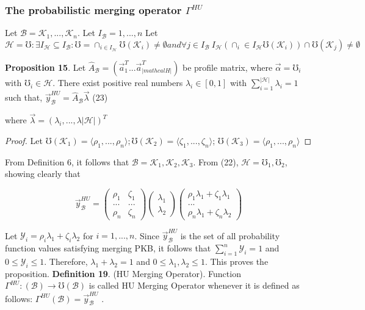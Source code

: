 \documentclass[]{iosart2c}
\begin{document}
\subsubsection{The probabilistic merging operator $\Gamma^{HU}$}

Let  $\mathcal{B} = {\mathcal{K}_1, ...,\mathcal{K}_n}$. Let $I_\mathcal{B} = {1, ..., n} $
Let $\mathcal{H} = { \mho : \exists I_\mathcal{H} \subseteq I_\mathcal{B} : \mho = \cap_{i \in I_\mathcal{H}} \mho(\mathcal{K}_i) \neq \emptyset and \forall j \in I_\mathcal{B} \ I_\mathcal{H}(\cap_i\in I_\mathcal{H} \mho(\mathcal{K}_i)) \cap \mho(\mathcal{K}_j) \neq \emptyset }$

\textbf{Proposition 15}. Let $\hat{A}_\mathcal{B} = (\vec{a}^T_1 ...\vec{a}^T_|mathcal{H}|)$ be profile
matrix, where $\vec{\alpha} = \mho_i$ with $\mho_i \in \mathcal{H}$. There exist positive
real numbers $\lambda_i \in [0, 1]$ with $\sum^{|\mathcal{H}|}_{i=1} \lambda_i = 1$ such
that,
$\vec{y}^{HU}_\mathcal{B} = \hat{A}_\mathcal{B}\vec{\lambda}$ (23)

where $\vec{\lambda} = (\lambda_i, ..., \lambda|\mathcal{H}|)^T$

\begin{proof}Let $\mho(\mathcal{K}_1)=\langle \rho_1, ..., \rho_n \rangle;\mho(\mathcal{K}_2)=\langle\zeta_1, ..., \zeta_n \rangle$;
$\mho(\mathcal{K}_3) = \langle\rho_1, ..., \rho_n\rangle$
 \end{proof}
From Definition 6, it follows that $\mathcal{B} = {\mathcal{K}_1,
\mathcal{K}_2,\mathcal{K}_3}$. From (22), $\mathcal{H} = {\mho_1,\mho_2}$, showing clearly
that

$$
\vec{y}^{HU}_\mathcal{B} =
\left( \begin{array}{cc}
\rho_1 &\zeta_1 \\
... &... \\
\rho_n &\zeta_n
\end{array} \right)
%
\left( \begin{array}{cc}
\lambda_1\\
\lambda_2
\end{array}
\right)
\left( \begin{array}{cc}
\rho_1\lambda_1 + \zeta_1\lambda_1\\
...\\
\rho_n\lambda_1 + \zeta_n\lambda_2
\end{array} \right)
$$

Let $\mathcal{Y}_i = \rho_i\lambda_1 + \zeta_i\lambda_2$ for $i = 1, ... , n$. Since $\vec{y}^{HU}_\mathcal{B}$
 is the set of all probability function values satisfying
merging PKB, it follows that $\sum^n_{i=1} \mathcal{Y}_i = 1$ and $0 \le 
\mathcal{Y}_i \le 1$. Therefore, $\lambda_1 + \lambda_2 = 1$ and $0 \le \lambda_1, \lambda_2 \le 1$.
 This proves the proposition.
\textbf{Definition 19}. (HU Merging Operator). Function
$\Gamma^{HU} : (\mathcal{B}) \to \mho(\mathcal{B})$ is called HU Merging Operator
whenever it is defined as follows: $\Gamma^{HU}(\mathcal{B}) = \vec{y}^{HU}_\mathcal{B}$ .
\end{document}
